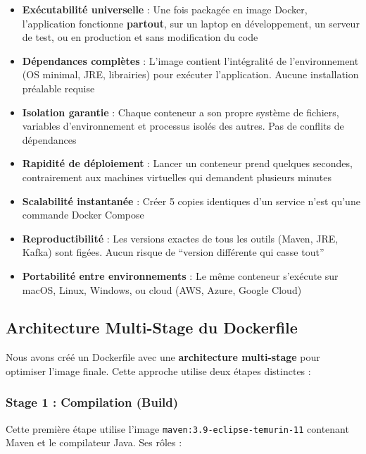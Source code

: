 \documentclass[10pt,a4paper]{article}
\begin{document}
\begin{itemize}
    \item \textbf{Exécutabilité universelle} : Une fois packagée en image Docker, l'application fonctionne \textbf{partout}, sur un laptop en développement, un serveur de test, ou en production et sans modification du code
    
    \item \textbf{Dépendances complètes} : L'image contient l'intégralité de l'environnement (OS minimal, JRE, librairies) pour exécuter l'application. Aucune installation préalable requise
    
    \item \textbf{Isolation garantie} : Chaque conteneur a son propre système de fichiers, variables d'environnement et processus isolés des autres. Pas de conflits de dépendances
    
    \item \textbf{Rapidité de déploiement} : Lancer un conteneur prend quelques secondes, contrairement aux machines virtuelles qui demandent plusieurs minutes
    
    \item \textbf{Scalabilité instantanée} : Créer 5 copies identiques d'un service n'est qu'une commande Docker Compose
    
    \item \textbf{Reproductibilité} : Les versions exactes de tous les outils (Maven, JRE, Kafka) sont figées. Aucun risque de ``version différente qui casse tout''
    
    \item \textbf{Portabilité entre environnements} : Le même conteneur s'exécute sur macOS, Linux, Windows, ou cloud (AWS, Azure, Google Cloud)
\end{itemize}

\subsection{Architecture Multi-Stage du Dockerfile}

Nous avons créé un Dockerfile avec une \textbf{architecture multi-stage} pour optimiser l'image finale. Cette approche utilise deux étapes distinctes :

\subsubsection{Stage 1 : Compilation (Build)}

Cette première étape utilise l'image \texttt{maven:3.9-eclipse-temurin-11} contenant Maven et le compilateur Java. Ses rôles :
\end{document}
